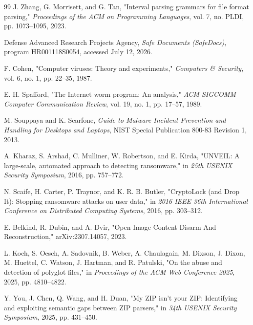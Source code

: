\begin{thebibliography}{99}
J. Zhang, G. Morrisett, and G. Tan, "Interval parsing grammars for file
format parsing," \emph{Proceedings of the ACM on Programming Languages},
vol. 7, no. PLDI, pp. 1073--1095, 2023.

Defense Advanced Research Projects Agency, \emph{Safe Documents (SafeDocs)},
program HR001118S0054, accessed July 12, 2026.

F. Cohen, "Computer viruses: Theory and experiments,"
\emph{Computers \& Security}, vol. 6, no. 1, pp. 22--35, 1987.

E. H. Spafford, "The Internet worm program: An analysis,"
\emph{ACM SIGCOMM Computer Communication Review}, vol. 19, no. 1,
pp. 17--57, 1989.

M. Souppaya and K. Scarfone, \emph{Guide to Malware Incident Prevention
and Handling for Desktops and Laptops}, NIST Special Publication 800-83
Revision 1, 2013.

A. Kharaz, S. Arshad, C. Mulliner, W. Robertson, and E. Kirda,
"UNVEIL: A large-scale, automated approach to detecting ransomware,"
in \emph{25th USENIX Security Symposium}, 2016, pp. 757--772.

N. Scaife, H. Carter, P. Traynor, and K. R. B. Butler,
"CryptoLock (and Drop It): Stopping ransomware attacks on user data,"
in \emph{2016 IEEE 36th International Conference on Distributed
Computing Systems}, 2016, pp. 303--312.

E. Belkind, R. Dubin, and A. Dvir,
"Open Image Content Disarm And Reconstruction," arXiv:2307.14057, 2023.

L. Koch, S. Oesch, A. Sadovnik, B. Weber, A. Chaulagain, M. Dixson,
J. Dixon, M. Huettel, C. Watson, J. Hartman, and R. Patulski,
"On the abuse and detection of polyglot files," in
\emph{Proceedings of the ACM Web Conference 2025}, 2025, pp. 4810--4822.

Y. You, J. Chen, Q. Wang, and H. Duan, "My ZIP isn't your ZIP:
Identifying and exploiting semantic gaps between ZIP parsers," in
\emph{34th USENIX Security Symposium}, 2025, pp. 431--450.


\end{thebibliography}
